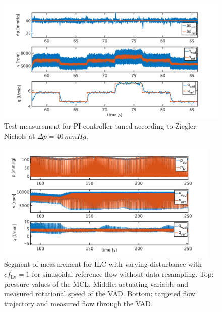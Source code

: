 \begin{figure}[ht!]
  \centering
  \includegraphics[width=\textwidth]{images/chapt_5/pi_contr_zn_40.pdf}
  \caption[Test measurement for PI controller tuned according to Ziegler Nichols at $\Delta{p}=40\,mmHg$]{Test measurement for PI controller tuned according to Ziegler Nichols at $\Delta{p}=40\,mmHg$.}
  \label{fig:anh_8}
\end{figure}


\begin{figure}[ht!]
  \centering
  \includegraphics[width=0.95\textwidth]{images/chapt_5/ILC/ilc_var_dist_unfix_sine.pdf}
  \caption[Segment of measurement for ILC with varying disturbance with $cf_{\mathrm{Lv}}=1$ for sinusoidal reference flow without data resampling]{Segment of measurement for ILC with varying disturbance with $cf_{\mathrm{Lv}}=1$ for sinusoidal reference flow without data resampling. Top:  pressure values of the MCL. Middle: actuating variable and measured rotational speed of the VAD. Bottom: targeted flow trajectory and measured flow through the VAD.}
 \label{fig:anh_9}
\end{figure}


